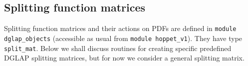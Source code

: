 \documentclass[12pt]{article}
\newcommand{\comment}[1]{\textbf{[#1]}}
\newcommand{\ttt}[1]{\texttt{#1}}
\begin{document}
\subsection{Splitting function matrices}
\label{sec:splitt-funct-matr}

Splitting function matrices and their actions on PDFs are defined in
\ttt{module dglap\_objects} (accessible as usual from \ttt{module
  hoppet\_v1}). They have type \ttt{split\_mat}. Below we shall discuss
routines for creating specific predefined DGLAP splitting matrices,
but for now we consider a general splitting matrix.
\end{document}
